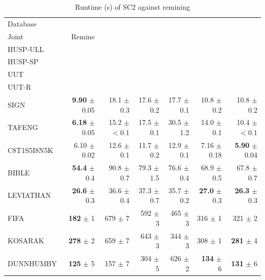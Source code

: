 \begin{table}[!htbp]\centering
\caption{Runtime (s) of SC2 against remining}\label{tab:sc2_remine}
\setlength{\tabcolsep}{3pt}
\begin{tabular*}{\textwidth}{@{\extracolsep\fill}lrrrrrr}\toprule
Database & \begin{tabular}[b]{@{}r@{}}Pre-HUSPM-\\Joint\end{tabular} & Remine & \begin{tabular}[b]{@{}r@{}}Remine-\\HUSP-ULL\end{tabular} & \begin{tabular}[b]{@{}r@{}}Remine-\\HUSP-SP\end{tabular} & \begin{tabular}[b]{@{}r@{}}Remine-\\UUT\end{tabular} & \begin{tabular}[b]{@{}r@{}}Remine-\\UUT-R\end{tabular} \\\midrule
SIGN & \textbf{9.90} $\pm$ 0.05 & 18.1 $\pm$ 0.3 & 17.6 $\pm$ 0.2 & 17.7 $\pm$ 0.1 & 10.8 $\pm$ 0.2 & 10.8 $\pm$ 0.2 \\
TAFENG & \textbf{6.18} $\pm$ 0.05 & 15.2 $\pm$ $<$0.1 & 17.5 $\pm$ 0.1 & 30.5 $\pm$ 1.2 & 14.0 $\pm$ 0.1 & 10.4 $\pm$ $<$0.1 \\
C8T1S5I8N5K & 6.10 $\pm$ 0.02 & 12.6 $\pm$ 0.1 & 11.7 $\pm$ 0.2 & 12.9 $\pm$ 0.1 & 7.16 $\pm$ 0.18 & \textbf{5.90} $\pm$ 0.04 \\
BIBLE & \textbf{54.4} $\pm$ 0.4 & 90.8 $\pm$ 0.7 & 79.3 $\pm$ 1.5 & 76.6 $\pm$ 0.4 & 68.9 $\pm$ 0.5 & 67.8 $\pm$ 0.7 \\
LEVIATHAN & \textbf{26.6} $\pm$ 0.3 & 36.6 $\pm$ 0.4 & 37.3 $\pm$ 0.7 & 35.7 $\pm$ 0.2 & \textbf{27.0} $\pm$ 0.3 & \textbf{26.3} $\pm$ 0.3 \\
FIFA & \textbf{182} $\pm$ 1 & 679 $\pm$ 7 & 592 $\pm$ 3 & 465 $\pm$ 3 & 316 $\pm$ 1 & 321 $\pm$ 2 \\
KOSARAK & \textbf{278} $\pm$ 2 & 659 $\pm$ 7 & 643 $\pm$ 3 & 344 $\pm$ 3 & 308 $\pm$ 1 & \textbf{281} $\pm$ 4 \\
DUNNHUMBY & \textbf{125} $\pm$ 5 & 157 $\pm$ 7 & 304 $\pm$ 5 & 626 $\pm$ 2 & \textbf{134} $\pm$ 6 & \textbf{131} $\pm$ 6 \\
\bottomrule\end{tabular*}
\end{table}
